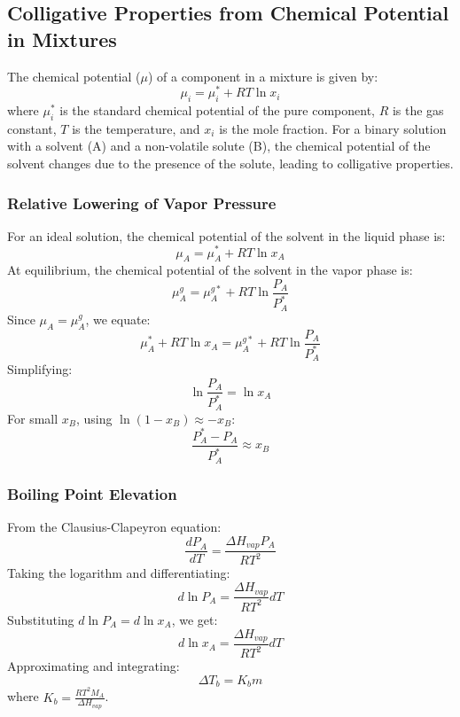 \documentclass{article}
\theoremstyle{definition}
\begin{document}
\subsection{Colligative Properties from Chemical Potential in Mixtures}
The chemical potential (\(\mu\)) of a component in a mixture is given by:
\begin{equation}
    \mu_i = \mu_i^* + RT \ln x_i
\end{equation}
where \(\mu_i^*\) is the standard chemical potential of the pure component, \(R\) is the gas constant, \(T\) is the temperature, and \(x_i\) is the mole fraction.
For a binary solution with a solvent (A) and a non-volatile solute (B), the chemical potential of the solvent changes due to the presence of the solute, leading to colligative properties.

\subsubsection{Relative Lowering of Vapor Pressure}
For an ideal solution, the chemical potential of the solvent in the liquid phase is:
\begin{equation}
    \mu_A = \mu_A^* + RT \ln x_A
\end{equation}
At equilibrium, the chemical potential of the solvent in the vapor phase is:
\begin{equation}
    \mu_A^g = \mu_A^{g*} + RT \ln \frac{P_A}{P_A^*}
\end{equation}
Since \( \mu_A = \mu_A^g \), we equate:
\begin{equation}
    \mu_A^* + RT \ln x_A = \mu_A^{g*} + RT \ln \frac{P_A}{P_A^*}
\end{equation}
Simplifying:
\begin{equation}
    \ln \frac{P_A}{P_A^*} = \ln x_A
\end{equation}
For small \( x_B \), using \( \ln(1 - x_B) \approx -x_B \):
\begin{equation}
    \frac{P_A^* - P_A}{P_A^*} \approx x_B
\end{equation}

\subsubsection{Boiling Point Elevation}
From the Clausius-Clapeyron equation:
\begin{equation}
    \frac{dP_A}{dT} = \frac{\Delta H_{vap} P_A}{RT^2}
\end{equation}
Taking the logarithm and differentiating:
\begin{equation}
    d \ln P_A = \frac{\Delta H_{vap}}{RT^2} dT
\end{equation}
Substituting \( d \ln P_A = d \ln x_A \), we get:
\begin{equation}
    d \ln x_A = \frac{\Delta H_{vap}}{RT^2} dT
\end{equation}
Approximating and integrating:
\begin{equation}
    \Delta T_b = K_b m
\end{equation}
where \( K_b = \frac{RT^2 M_A}{\Delta H_{vap}} \).
\end{document}
